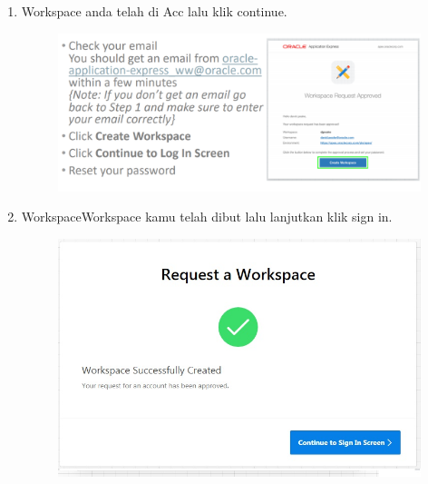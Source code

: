 \begin{enumerate}
    \item Workspace anda telah di Acc lalu klik continue.
       \begin{figure}[!htbp]
    \centering
    \includegraphics[scale=0.5]{section/ica10.PNG}
    \label{gambar 1}
\end{figure}
\item WorkspaceWorkspace kamu telah dibut lalu lanjutkan klik sign in.
       \begin{figure}[!htbp]
    \centering
    \includegraphics[scale=0.6]{section/ica12.jpg}
    \label{gambar 1}
\end{figure}
\vspace{12cm}

\vspace{4cm}








  \begin{enumerate}
   
      
  \end{enumerate}
  \end{enumerate}
